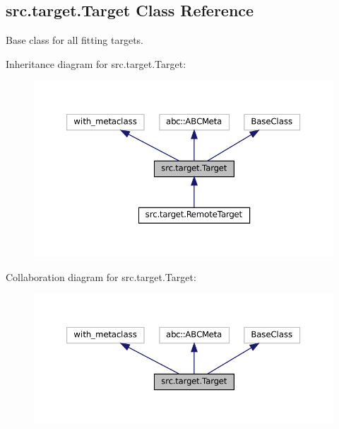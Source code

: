\hypertarget{classsrc_1_1target_1_1Target}{}\subsection{src.\+target.\+Target Class Reference}
\label{classsrc_1_1target_1_1Target}


Base class for all fitting targets.  




Inheritance diagram for src.\+target.\+Target\+:
\nopagebreak
\begin{figure}[H]
\begin{center}
\leavevmode
\includegraphics[width=350pt]{classsrc_1_1target_1_1Target__inherit__graph}
\end{center}
\end{figure}


Collaboration diagram for src.\+target.\+Target\+:
\nopagebreak
\begin{figure}[H]
\begin{center}
\leavevmode
\includegraphics[width=350pt]{classsrc_1_1target_1_1Target__coll__graph}
\end{center}
\end{figure}

